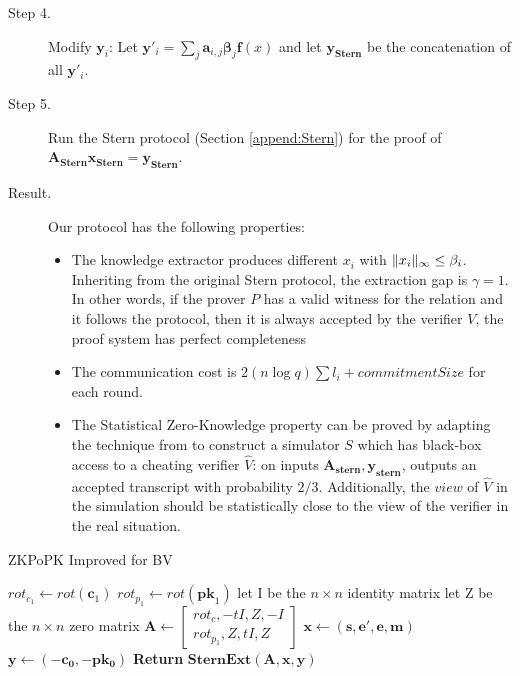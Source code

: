 \begin{description}
\item [Step 4.] Modify $\mathbf{y}_i$: Let
  $\mathbf{y}'_i = \sum_{j}\mathbf{a}_{i,j}\mathbf{\beta}_{j}\mathbf{f}(x)$ and
  let $\mathbf{y_{Stern}}$ be the concatenation of all $\mathbf{y}'_i$.


\item [Step 5.] Run the Stern protocol (Section \ref{append:Stern}) for the proof of $\mathbf{A_{Stern}x_{Stern} = y_{Stern}}$.

\item [Result.] Our protocol has the following properties:
  \begin{itemize}
  \item The knowledge extractor produces different $x_i$ with
    $\Vert x_i \Vert_{\infty} \leq \beta_i$. Inheriting from the original Stern protocol,
    the extraction gap is $\gamma = 1$. In other words, if the prover $P$ has a
    valid witness for the relation and it follows the protocol, then it is
    always accepted by the verifier $V$, the proof system has perfect
    completeness
  \item The communication cost is $2(n\log q){\sum{l_i}} + commitmentSize$ for
    each round.
  \item The Statistical Zero-Knowledge property can be proved by adapting the
    technique from \cite{stern1993new, kawachi2008concurrently} to construct a
    simulator $S$ which has black-box access to a cheating verifier $\hat{V}$:
    on inputs $\mathbf{A_{stern},y_{stern}}$, outputs an accepted transcript
    with probability $2/3$. Additionally, the $view$ of $\hat{V}$ in the
    simulation should be statistically close to the view of the verifier in the
    real situation.

  \end{itemize}

\end{description}

  \begin{algorithm}
    \caption{ZKPoPK Improved for BV}\label{alg:ZKPBVImproved}
    \begin{algorithmic}[1]
      \State $rot_{c_1} \gets rot(\mathbf{c}_1)$
      \State $rot_{p_1} \gets rot(\mathbf{pk}_1)$
      \State let I be the $n \times n$ identity matrix
      \State let Z be the $n \times n $ zero matrix
      \State $\mathbf{A} \gets
      \begin{bmatrix*}
        rot_{c}, -tI, Z, -I\\
        rot_{p_{1}}, Z, tI, Z
      \end{bmatrix*}
$
      \State $\mathbf{x} \gets (\mathbf{s, e', e, m})$
      \State $\mathbf{y} \gets (\mathbf{-c_0, -pk_0})$
      \State \textbf{Return} $\mathbf{SternExt(A,x,y)}$
      \EndProcedure
    \end{algorithmic}
  \end{algorithm}


